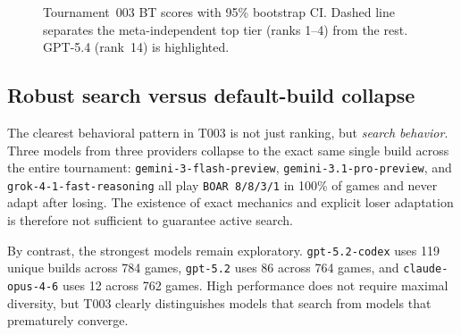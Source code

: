 \documentclass[11pt]{article}
\newcommand{\tThree}{T003}
\begin{document}
\begin{figure}[t]
\centering
{}
\caption{Tournament~003 BT scores with 95\% bootstrap CI. Dashed line separates the meta-independent top tier (ranks 1--4) from the rest. GPT-5.4 (rank~14) is highlighted.}
\label{fig:t3_bt}
\end{figure}

\subsection{Robust search versus default-build collapse}

The clearest behavioral pattern in \tThree{} is not just ranking, but \emph{search behavior}.
Three models from three providers collapse to the exact same single build across the entire tournament:
\texttt{gemini-3-flash-preview}, \texttt{gemini-3.1-pro-preview}, and \texttt{grok-4-1-fast-reasoning} all play \texttt{BOAR 8/8/3/1} in 100\% of games and never adapt after losing.
The existence of exact mechanics and explicit loser adaptation is therefore not sufficient to guarantee active search.

By contrast, the strongest models remain exploratory.
\texttt{gpt-5.2-codex} uses 119 unique builds across 784 games, \texttt{gpt-5.2} uses 86 across 764 games, and \texttt{claude-opus-4-6} uses 12 across 762 games.
High performance does not require maximal diversity, but \tThree{} clearly distinguishes models that search from models that prematurely converge.
\end{document}
